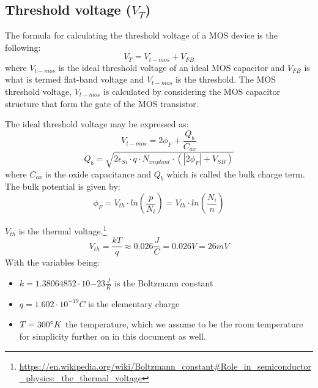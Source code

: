 \subsection{Threshold voltage ($V_T$)}\label{transistor_threshold_calculation}
The formula for calculating the threshold voltage of a MOS device is the following:
\begin{equation}
V_T = V_{t-mos} + V_{FB}
\end{equation}
where $V_{t-mos}$ is the ideal threshold voltage of an ideal MOS capacitor and $V_{FB}$ is what is termed flat-band voltage and $V_{t-mos}$ is the threshold.
The MOS threshold voltage, $V_{t-mos}$ is calculated by considering the MOS capacitor structure that form the gate of the MOS transistor.

The ideal threshold voltage may be expressed as:
\begin{equation}
V_{t-mos}=2 \phi_F + \frac{Q_b}{C_{ox}}
\end{equation}
\begin{equation}
Q_b
=
\sqrt{2 \epsilon_{Si} \cdot q \cdot N_{implant}  \cdot  ( \left| 2 \phi_F \right| + V_{SB}) }
\end{equation}
where $C_{ox}$ is the oxide capacitance and $Q_b$ which is called the bulk charge term.\\

The bulk potential is given by:
\begin{equation}
\phi_F
=
V_{th} \cdot ln\left(\frac{p}{N_i}\right)
=
V_{th} \cdot ln\left(\frac{N_i}{n}\right)
\end{equation}

$V_{th}$ is the thermal voltage.\footnote{\url{https://en.wikipedia.org/wiki/Boltzmann_constant\#Role_in_semiconductor_physics:_the_thermal_voltage}}
\begin{equation}
V_{th} = \frac{k T}{q} \approx 0.026 \frac{J}{C} = 0.026 V = 26mV
\end{equation}
With the variables being:
\begin{itemize}
\item $k=1.38064852\cdot 10{-23}  \frac{J}{K}$ is the Boltzmann constant
\item $q=1.602 \cdot 10^{-19} C$ is the elementary charge
\item $T= 300 \degree K$ the temperature, which we assume to be the room temperature for simplicity further on in this document as well.
\end{itemize}


